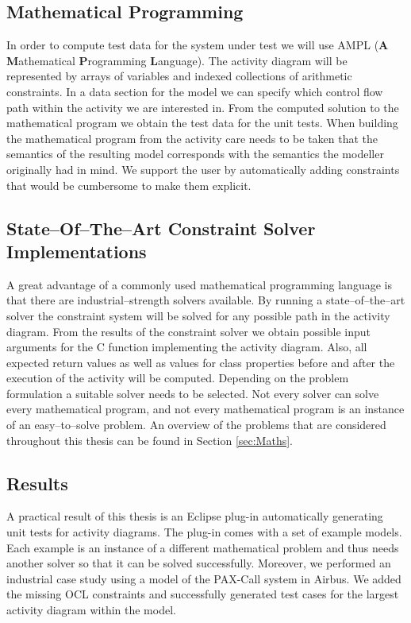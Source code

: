 \subsection{Mathematical Programming}
In order to compute test data for the system under test we will use AMPL (\textbf{A} \textbf{M}athematical \textbf{P}rogramming \textbf{L}anguage). The activity diagram will be represented by arrays of variables and indexed collections of arithmetic constraints. In a data section for the model we can specify which control flow path within the activity we are interested in. From the computed solution to the mathematical program we obtain the test data for the unit tests. When building the mathematical program from the activity care needs to be taken that the semantics of the resulting model corresponds with the semantics the modeller originally had in mind. We support the user by automatically adding constraints that would be cumbersome to make them explicit.
\subsection{State--Of--The--Art Constraint Solver Implementations} 
A great advantage of a commonly used mathematical programming language is that there are industrial--strength solvers available. By running a state--of--the--art solver the constraint system will be solved for any possible path in the activity diagram. From the results of the constraint solver we obtain possible input arguments for the C function implementing the activity diagram. Also, all expected return values as well as values for class properties before and after the execution of the activity will be computed. Depending on the problem formulation a suitable solver needs to be selected. Not every solver can solve every mathematical program, and not every mathematical program is an instance of an easy--to--solve problem. An overview of the problems that are considered throughout this thesis can be found in Section \ref{sec:Maths}.
\subsection{Results}
A practical result of this thesis is an Eclipse plug-in automatically generating unit tests for activity diagrams. The plug-in comes with a set of example models. Each example is an instance of a different mathematical problem and thus needs another solver so that it can be solved successfully. Moreover, we performed an industrial case study using a model of the PAX-Call system in Airbus. We added the missing OCL constraints and successfully generated test cases for the largest activity diagram within the model.

